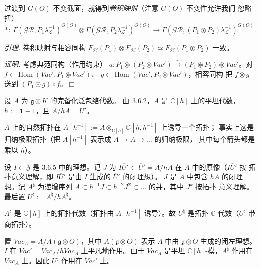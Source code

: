 过渡到 $G(O)$-不变截面，就得到\emph{卷积映射}（注意 $G(O)$-不变性允许我们
忽略扭）
\begin{equation}\tag{290}
*:\ \Gamma(\mathcal{GR},P_1\lambda_{\mathcal{L}}^{-1})^{G(O)}\otimes
\Gamma(\mathcal{GR},P_2\lambda_{\mathcal{L}}^{-1})^{G(O)}\to
\Gamma(\mathcal{GR},(P_1\circledast P_2)\lambda_{\mathcal{L}}^{-1})^{G(O)}.
\end{equation}

 \emph{引理.} 卷积映射与相容同构
$F_{\mathcal{H}}(P_1)\otimes F_{\mathcal{H}}(P_2)\simeq
F_{\mathcal{H}}(P_1\circledast P_2)$ 一致。

\emph{证明.} 考虑典范同构（作用约束）
$a:P_1\circledast(P_2\circledast\mathit{Vac}')\xrightarrow{\sim}
(P_1\circledast P_2)\circledast\mathit{Vac}'$。对
$f\in\operatorname{Hom}(\mathit{Vac}',P_1\circledast\mathit{Vac}')$、
$g\in\operatorname{Hom}(\mathit{Vac}',P_2\circledast\mathit{Vac}')$，相容同构
把 $f\otimes g$ 送到 $(P_1\circledast g)\circ f$。\hfill$\Box$


 设 $A$ 为 $\widetilde{\mathfrak{g}\otimes K}$ 的完备化泛包络代数。
由 3.6.2，$A$ 是 $\mathbb{C}[h]$ 上的平坦代数，$h:=\mathbf{1}-1$，且
$A/hA=\overline{U}'$。

$A$ 上的自然拓扑在
$A[h^{-1}]:=A\otimes_{\mathbb{C}[h]}\mathbb{C}[h,h^{-1}]$ 上诱导一个拓扑；
事实上这是归纳极限拓扑（把 $A[h^{-1}]$ 表示成 $A\to A\to\ldots$ 的归纳极限，
其中每个箭头都是乘以 $h$）。

设 $I\subset\mathfrak{Z}$ 是 3.6.5 中的理想。记 $J$ 为
$I\overline{U}'\subset\overline{U}'=A/hA$ 在 $A$ 中的原像（$I\overline{U}'$ 按
拓扑意义理解，即 $I\overline{U}'$ 是由 $I$ 生成的 $\overline{U}'$ 的闭理想）。
$J$ 是 $A$ 中包含 $hA$ 的闭理想。记 $A^{\natural}$ 为递增序列
$A\subset h^{-1}J\subset h^{-2}J^{2}\subset\ldots$ 的并，其中 $J^{k}$ 按拓扑
意义理解。最后置 $U^{\natural}:=A^{\natural}/hA^{\natural}$。


$A^{\natural}$ 是 $\mathbb{C}[h]$ 上的拓扑代数（拓扑由 $A[h^{-1}]$ 诱导）。故
$U^{\natural}$ 是拓扑 $\mathbb{C}$-代数（$U^{\natural}$ 带商拓扑）。

 置 $\mathit{Vac}_A=A/A(\mathfrak{g}\otimes O)$，其中
$A(\mathfrak{g}\otimes O)$ 表示 $A$ 中由 $\mathfrak{g}\otimes O$ 生成的闭左理想。
$I$ 在 $\mathit{Vac}'=\mathit{Vac}_A/h\mathit{Vac}_A$ 上平凡地作用。由于
$\mathit{Vac}_A$ 是平坦 $\mathbb{C}[h]$-模，$A^{\natural}$ 作用在
$\mathit{Vac}_A$ 上。因此 $U^{\natural}$ 作用在 $\mathit{Vac}'$ 上。

